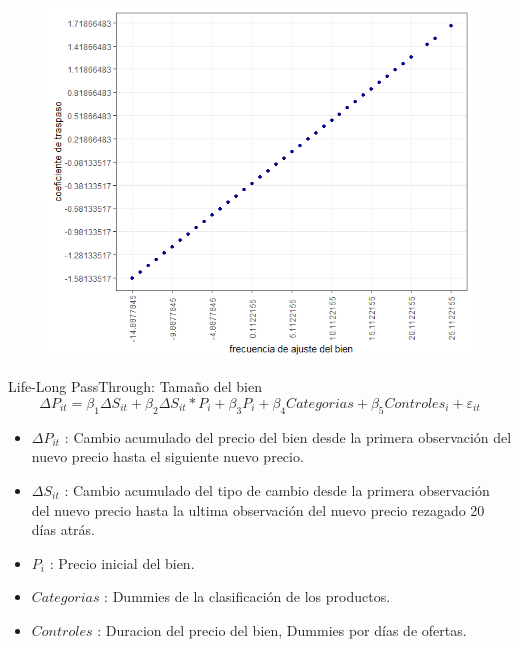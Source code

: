 \documentclass[xcolor=dvipsnames]{beamer}
\begin{document}
\begin{frame}
\begin{figure}
\includegraphics[scale=0.50]{E1.png}
\end{figure}
\end{frame}

\begin{frame}
Life-Long PassThrough: Tamaño del bien
\begin{equation}
\Delta P_{it} = \beta_{1} \Delta S_{it}  + \beta_{2} \Delta S_{it}*P_{i} + \beta_{3}P_{i} + \beta_{4}Categorias + \beta_{5}Controles_{i} + \varepsilon_{it}
\end{equation}
\begin{itemize}
	\item $\Delta P_{it}$ : Cambio acumulado del precio del bien desde la primera observaci\'on del nuevo precio hasta el siguiente nuevo precio.
	\item $\Delta S_{it}$ : Cambio acumulado del tipo de cambio desde la primera observaci\'on del nuevo precio hasta la ultima observaci\'on del nuevo precio rezagado 20 d\'ias atr\'as.
	\item $P_{i}$ : Precio inicial del bien.
	\item $Categorias$ : Dummies de la clasificaci\'on de los productos.
	\item $Controles$ : Duracion del precio del bien, Dummies por d\'ias de ofertas.
\end{itemize}
\end{frame}
\end{document}
